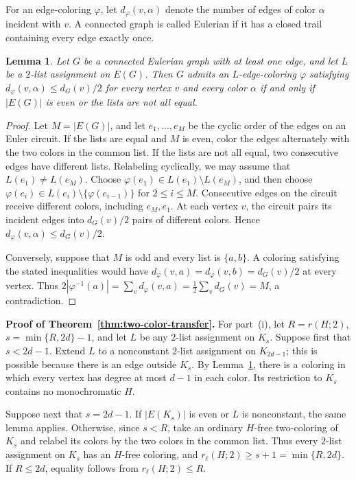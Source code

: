 \documentclass[11pt]{article}
\newtheorem{lemma}[theorem]{Lemma}
\theoremstyle{definition}
\theoremstyle{remark}
\begin{document}
\medskip
For an edge-coloring \(\varphi\), let \(d_{\varphi}(v,\alpha)\)
denote the number of edges of color \(\alpha\) incident with \(v\). A connected graph is called Eulerian if it has a closed trail
containing every edge exactly once.

\begin{lemma}
\label{lem:euler-tour-balancing}
Let \(G\) be a connected Eulerian graph with at least one edge, and
let \(L\) be a \(2\)-list assignment on \(E(G)\). Then \(G\) admits
an \(L\)-edge-coloring \(\varphi\) satisfying
\(d_{\varphi}(v,\alpha)\le d_G(v)/2\) for every vertex \(v\) and
every color \(\alpha\) if and only if \(|E(G)|\) is even or the
lists are not all equal.
\end{lemma}

\begin{proof}
Let \(M=|E(G)|\), and let \(e_1,\ldots,e_M\) be the cyclic order
of the edges on an Euler circuit. If the lists are equal and \(M\)
is even, color the edges alternately with the two colors in the
common list. If the lists are not all equal, two consecutive edges
have different lists. Relabeling cyclically, we may assume that
\(L(e_1)\ne L(e_M)\). Choose
\(\varphi(e_1)\in L(e_1)\setminus L(e_M)\), and then choose
\(\varphi(e_i)\in L(e_i)\setminus\{\varphi(e_{i-1})\}\) for
\(2\le i\le M\). Consecutive edges on the circuit receive different
colors, including \(e_M,e_1\). At each vertex \(v\), the circuit
pairs its incident edges into \(d_G(v)/2\) pairs of different
colors. Hence \(d_{\varphi}(v,\alpha)\le d_G(v)/2\).

Conversely, suppose that \(M\) is odd and every list is \(\{a,b\}\).
A coloring satisfying the stated inequalities would have
\(d_{\varphi}(v,a)=d_{\varphi}(v,b)=d_G(v)/2\) at every vertex.
Thus \(2|\varphi^{-1}(a)|=\sum_v d_{\varphi}(v,a)
=\tfrac12\sum_v d_G(v)=M\), a contradiction.
\end{proof}

\textbf{Proof of Theorem~\ref{thm:two-color-transfer}.}
For part~\textup{(i)}, let \(R=r(H;2)\),
\(s=\min\{R,2d\}-1\), and let \(L\) be any \(2\)-list assignment
on \(K_s\). Suppose first that \(s<2d-1\). Extend \(L\) to a
nonconstant \(2\)-list assignment on \(K_{2d-1}\); this is possible
because there is an edge outside \(K_s\). By
Lemma~\ref{lem:euler-tour-balancing}, there is a coloring in which
every vertex has degree at most \(d-1\) in each color. Its
restriction to \(K_s\) contains no monochromatic \(H\).

Suppose next that \(s=2d-1\). If \(|E(K_s)|\) is even or \(L\)
is nonconstant, the same lemma applies. Otherwise, since \(s<R\),
take an ordinary \(H\)-free two-coloring of \(K_s\) and relabel
its colors by the two colors in the common list. Thus every
\(2\)-list assignment on \(K_s\) has an \(H\)-free coloring, and
\(r_\ell(H;2)\ge s+1=\min\{R,2d\}\). If \(R\le2d\), equality
follows from \(r_\ell(H;2)\le R\).
\end{document}
